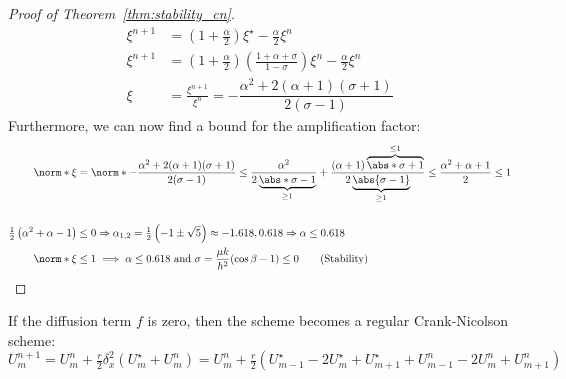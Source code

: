 \begin{proof}[Proof of Theorem~\ref{thm:stability_cn}]
\begin{align*}
    \xi^{n+1}               & = (1 + \tfrac{\alpha}{2}) \xi^\star - \tfrac{\alpha}{2} \xi^n                                                           \\
    \xi^{n+1}               & = \left(1 + \tfrac{\alpha}{2}\right)\left(\tfrac{1 + \alpha + \sigma}{1 - \sigma}\right)\xi^n - \tfrac{\alpha}{2} \xi^n \\
    \xi                     & = \tfrac{\xi^{n+1}}{\xi^n} = -\dfrac{\alpha^2 + 2(\alpha + 1) (\sigma + 1)}{2 (\sigma - 1)} \tag{Source: Trust me bro}
  \end{align*}
  Furthermore, we can now find a bound for the amplification factor:
  \begin{align*}
    \norm*{\xi}                                    & = \norm*{-\dfrac{\alpha^2 + 2(\alpha + 1)(\sigma + 1)}{2(\sigma - 1)}} \leq \dfrac{\alpha^2}{2\underbrace{\abs*{\sigma - 1}}_{\geq 1}} + \dfrac{(\alpha + 1)\overbrace{\abs*{\sigma + 1}}^{\leq 1}}{2\underbrace{\abs{\sigma - 1}}_{\geq 1}} \leq \dfrac{\alpha^2+ \alpha + 1}{2} \leq 1 \\                                                                                                                                                                                                                     \\
    \tfrac{1}{2}\left(\alpha^2 + \alpha - 1\right) & \leq 0 \Rightarrow \alpha_{1,2} = \tfrac{1}{2}\left(-1 \pm \sqrt{5}\right) \approx -1.618, 0.618 \Rightarrow \alpha \leq 0.618                                                                                                                                                           \\
    \norm*{\xi}                                    & \leq 1 \implies \alpha \leq 0.618 \text{ and } \sigma = \frac{\mu k}{h^2}(\cos\beta - 1) \leq 0 \tag{Stability}
  \end{align*}
\end{proof}


If the diffusion term \(f\) is zero, then the scheme becomes a regular Crank-Nicolson scheme:
\[
U_m^{n+1} = U_m^n + \tfrac{r}{2}\delta_x^2\left(U_m^\star + U_m^n\right) = U_m^n + \tfrac{r}{2}\left(U_{m-1}^\star - 2U_m^\star + U_{m+1}^\star + U_{m-1}^n - 2U_m^n + U_{m+1}^n \right)
\]
